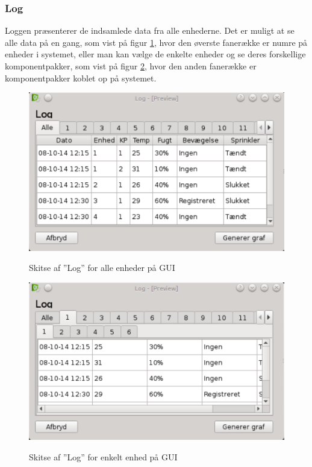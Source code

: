\subsubsection{Log}
Loggen præsenterer de indsamlede data fra alle enhederne. Det er muligt at se alle data på en gang, som vist på figur \ref{fig:GUI-log-alle}, hvor den øverste fanerække er numre på enheder i systemet, eller man kan vælge de enkelte enheder og se deres forskellige komponentpakker, som vist på figur \ref{fig:GUI-log-enhed}, hvor den anden fanerække er komponentpakker koblet op på systemet.

\begin{figure}[htbp] \centering
{\includegraphics[scale=0.5]{filer/pics/GUI/Log-alle}}
\caption{Skitse af ''Log'' for alle enheder på GUI}
\label{fig:GUI-log-alle}
\end{figure}

\begin{figure}[htbp] \centering
{\includegraphics[scale=0.5]{filer/pics/GUI/Log-enhed}}
\caption{Skitse af ''Log'' for enkelt enhed på GUI}
\label{fig:GUI-log-enhed}
\end{figure}



